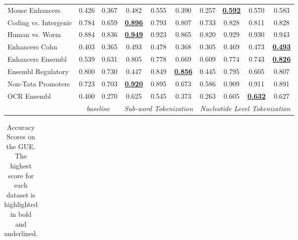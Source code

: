 \begin{table*}[h!]
\begin{center}
\begin{tabular}{l|cc|ccc|cccc}
Mouse Enhancers & 0.426 & 0.367 & 0.482 & 0.555 & 0.390 & 0.257 & {\ul \textbf{0.592}} & 0.570 & 0.583 \\
Coding vs. Intergenic & 0.784 & 0.659 & {\ul \textbf{0.896}} & 0.793 & 0.807 & 0.733 & 0.828 & 0.811 & 0.828 \\
Human vs. Worm & 0.884 & 0.836 & {\ul \textbf{0.949}} & 0.923 & 0.865 & 0.820 & 0.929 & 0.930 & 0.943 \\
Enhancers Cohn & 0.403 & 0.365 & 0.493 & 0.478 & 0.368 & 0.305 & 0.469 & 0.473 & {\ul \textbf{0.493}} \\
Enhancers Ensembl & 0.539 & 0.631 & 0.805 & 0.778 & 0.669 & 0.609 & 0.774 & 0.743 & {\ul \textbf{0.826}} \\
Ensembl Regulatory & 0.800 & 0.730 & 0.447 & 0.849 & {\ul \textbf{0.856}} & 0.445 & 0.795 & 0.605 & 0.807 \\
Non-Tata Promoters & 0.723 & 0.703 & {\ul \textbf{0.920}} & 0.895 & 0.673 & 0.586 & 0.909 & 0.911 & 0.891 \\
OCR Ensembl & 0.400 & 0.270 & 0.625 & 0.545 & 0.373 & 0.263 & 0.605 & {\ul \textbf{0.632}} & 0.627 \\
\hline
\multicolumn{1}{l|}{} & \multicolumn{2}{c|}{\textit{baseline}} & \multicolumn{3}{c|}{\textit{Sub-word Tokenization}} & \multicolumn{4}{c}{\textit{Nucleotide Level Tokenization}} \\ \hline
\end{tabular}
\end{center}
\end{table*}\begin{table*}[h!]
\small
\begin{center}
\caption{Accuracy Scores on the GUE. The highest score for each dataset is highlighted in bold and underlined.}
\label{table: GUE Results ACCURACY}
\begin{tabular}{l|cc|ccc|cccc}
\hline

\end{tabular}
\end{center}
\end{table*}
